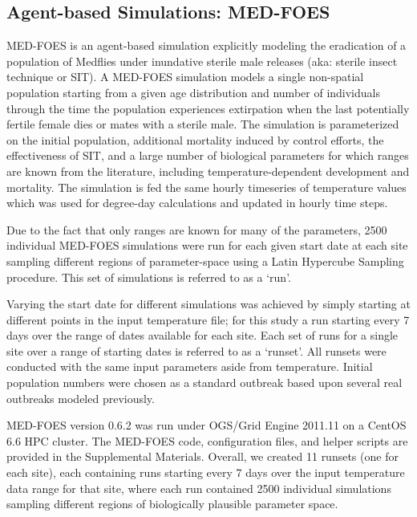 \documentclass[10pt,a4paper,twocolumn]{article}
\begin{document}
\subsection*{Agent-based Simulations: MED-FOES}

MED-FOES\cite{manoukis_computer_2014,manoukis_agent-based_2014} is 
an agent-based simulation explicitly modeling the eradication of a population of Medflies 
under inundative sterile male releases (aka: sterile insect technique or SIT).
A MED-FOES simulation models a single non-spatial population starting from a given age distribution 
and number of individuals through the time the population experiences extirpation when the last 
potentially fertile female dies or mates with a sterile male.
The simulation is parameterized on the initial population, additional mortality induced by control efforts,
the effectiveness of SIT, and a large number of biological parameters for which ranges are known from 
the literature, including temperature-dependent development and mortality.
The simulation is fed the same hourly timeseries of temperature values which was used for degree-day calculations
and updated in hourly time steps.

Due to the fact that only ranges are known for many of the parameters,
2500 individual MED-FOES simulations were run for each given start date at each site 
sampling different regions of parameter-space using a Latin Hypercube Sampling\cite{10.2307/1403510} procedure.
This set of simulations is referred to as a `run'.

Varying the start date for different simulations was achieved by simply 
starting at different points in the input temperature file; 
for this study a run starting every 7 days over the range of dates available for each site.
Each set of runs for a single site over a range of starting dates is referred to as a `runset'.
All runsets were conducted with the same input parameters aside from temperature.
Initial population numbers were chosen as a standard outbreak based upon several real 
outbreaks modeled previously\cite{manoukis_agent-based_2014}.

MED-FOES version 0.6.2 was run under OGS/Grid Engine 2011.11 on a CentOS 6.6 HPC cluster.
The MED-FOES code, configuration files, and helper scripts are provided in the Supplemental Materials.
Overall, we created 11 runsets (one for each site), 
each containing runs starting every 7 days over the input temperature data range for that site,
where each run contained 2500 individual simulations sampling different regions of 
biologically plausible parameter space.
\end{document}
